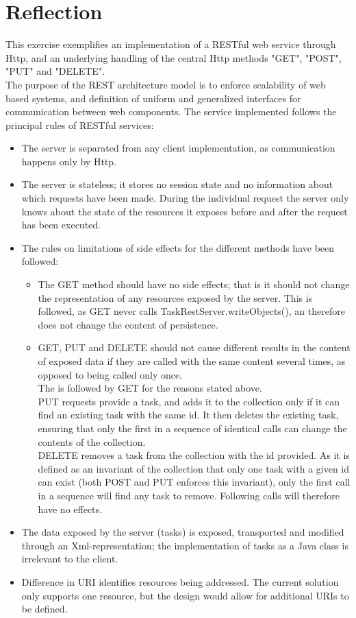 \section{Reflection}
\label{rest_reflection}
This exercise exemplifies an implementation of a RESTful web service through Http, and an underlying handling of the central Http methods "GET", "POST", "PUT" and "DELETE".\\
The purpose of the REST architecture model is to enforce scalability of web based systems, and definition of uniform and generalized interfaces for communication between web components. 
The service implemented follows the principal rules of RESTful services:
\begin{itemize}
	\item The server is separated from any client implementation, as communication happens only by Http.
	\item The server is stateless; it stores no session state and no information about which requests have been made. During the individual request the server only knows about the state of the resources it exposes before and after the request has been executed. 
	\item The rules on limitations of side effects for the different methods have been followed:
	\begin{itemize}
		\item The GET method should have no side effects; that is it should not change the representation of any resources exposed by the server. This is followed, as GET never calls TaskRestServer.writeObjects(), an therefore does not change the content of persistence. 
		\item GET, PUT and DELETE should not cause different results in the content of exposed data if they are called with the same content several times, as opposed to being called only once.\\
		The is followed by GET for the reasons stated above.\\
		PUT requests provide a task, and adds it to the collection only if it can find an existing task with the same id. It then deletes the existing task, ensuring that only the first in a sequence of identical calls can change the contents of the collection. \\
		DELETE removes a task from the collection with the id provided. As it is defined as an invariant of the collection that only one task with a given id can exist (both POST and PUT enforces this invariant), only the first call in a sequence will find any task to remove. Following calls will therefore have no effects. 
	\end{itemize}
	\item The data exposed by the server (tasks) is exposed, transported and modified through an Xml-representation; the implementation of tasks as a Java class is irrelevant to the client.
	\item Difference in URI identifies resources being addressed. The current solution only supports one resource, but the design would allow for additional URIs to be defined. 
\end{itemize}
	
